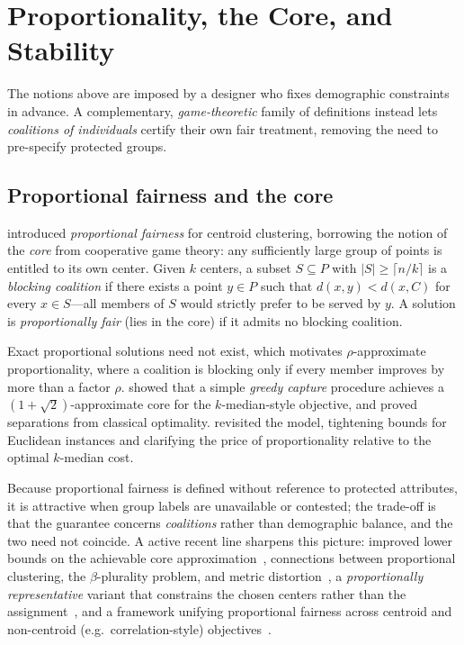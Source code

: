 \section{Proportionality, the Core, and Stability}\label{sec:prop}
\aibanner

The notions above are imposed by a designer who fixes demographic constraints in advance. A complementary, \emph{game-theoretic} family of definitions instead lets \emph{coalitions of individuals} certify their own fair treatment, removing the need to pre-specify protected groups.

\subsection{Proportional fairness and the core}
\citet{chen2019proportionally} introduced \emph{proportional fairness} for centroid clustering, borrowing the notion of the \emph{core} from cooperative game theory: any sufficiently large group of points is entitled to its own center. Given $k$ centers, a subset $S\subseteq P$ with $|S|\ge \lceil n/k\rceil$ is a \emph{blocking coalition} if there exists a point $y\in P$ such that $d(x,y)<d(x,C)$ for every $x\in S$---all members of $S$ would strictly prefer to be served by $y$. A solution is \emph{proportionally fair} (lies in the core) if it admits no blocking coalition.

Exact proportional solutions need not exist, which motivates $\rho$-approximate proportionality, where a coalition is blocking only if every member improves by more than a factor $\rho$. \citet{chen2019proportionally} showed that a simple \emph{greedy capture} procedure achieves a $(1+\sqrt{2})$-approximate core for the $k$-median-style objective, and proved separations from classical optimality. \citet{DBLP:conf/icalp/Micha020} revisited the model, tightening bounds for Euclidean instances and clarifying the price of proportionality relative to the optimal $k$-median cost.

Because proportional fairness is defined without reference to protected attributes, it is attractive when group labels are unavailable or contested; the trade-off is that the guarantee concerns \emph{coalitions} rather than demographic balance, and the two need not coincide. A active recent line sharpens this picture: improved lower bounds on the achievable core approximation~\citep{proplowerbounds2026}, connections between proportional clustering, the $\beta$-plurality problem, and metric distortion~\citep{propplurality2025}, a \emph{proportionally representative} variant that constrains the chosen centers rather than the assignment~\citep{proprepclustering2023}, and a framework unifying proportional fairness across centroid and non-centroid (e.g.\ correlation-style) objectives~\citep{unifyingprop2026}.

